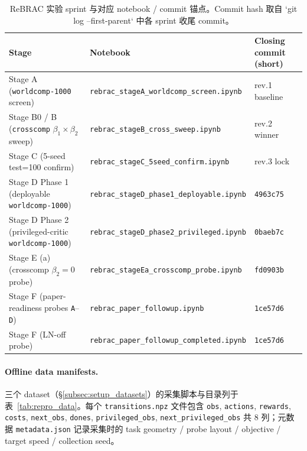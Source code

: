 \begin{table}[h]
\centering
\small
\caption{ReBRAC 实验 sprint 与对应 notebook / commit 锚点。Commit hash 取自 `git log --first-parent` 中各 sprint 收尾 commit。}
\label{tab:repro_notebooks}
\begin{tabular}{lll}
\toprule
\textbf{Stage} & \textbf{Notebook} & \textbf{Closing commit (short)} \\
\midrule
Stage A (\texttt{worldcomp-1000} screen)             & \texttt{rebrac\_stageA\_worldcomp\_screen.ipynb}      & rev.1 baseline \\
Stage B0 / B (\texttt{crosscomp} $\beta_1\!\times\!\beta_2$ sweep) & \texttt{rebrac\_stageB\_cross\_sweep.ipynb}           & rev.2 winner \\
Stage C (5-seed test=100 confirm)                    & \texttt{rebrac\_stageC\_5seed\_confirm.ipynb}         & rev.3 lock \\
Stage D Phase 1 (deployable \texttt{worldcomp-1000})  & \texttt{rebrac\_stageD\_phase1\_deployable.ipynb}     & \texttt{4963c75} \\
Stage D Phase 2 (privileged-critic \texttt{worldcomp-1000}) & \texttt{rebrac\_stageD\_phase2\_privileged.ipynb} & \texttt{0baeb7c} \\
Stage E (a) (crosscomp $\beta_2\!=\!0$ probe)         & \texttt{rebrac\_stageEa\_crosscomp\_probe.ipynb}     & \texttt{fd0903b} \\
Stage F (paper-readiness probes \texttt{A}–\texttt{D}) & \texttt{rebrac\_paper\_followup.ipynb}                & \texttt{1ce57d6} \\
Stage F (LN-off probe)                               & \texttt{rebrac\_paper\_followup\_completed.ipynb}    & \texttt{1ce57d6} \\
\bottomrule
\end{tabular}
\end{table}

\paragraph{Offline data manifests.}\quad
三个 dataset（\S\ref{subsec:setup_datasets}）的采集脚本与目录列于表~\ref{tab:repro_data}。每个 \texttt{transitions.npz} 文件包含 \texttt{obs}, \texttt{actions}, \texttt{rewards}, \texttt{costs}, \texttt{next\_obs}, \texttt{dones}, \texttt{privileged\_obs}, \texttt{next\_privileged\_obs} 共 8 列；元数据 \texttt{metadata.json} 记录采集时的 task geometry / probe layout / objective / target speed / collection seed。


